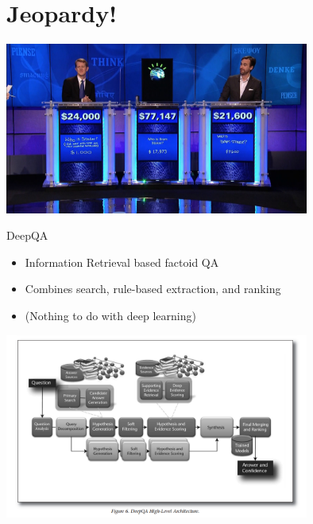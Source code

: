 \documentclass{beamer}
\begin{document}
{

}


{

}



{

}

{

}



{

}



\section{Jeopardy!}

\begin{frame}
  \begin{center}
    \includegraphics[width=10cm]{IBMwatson}
  \end{center}
\end{frame}

\begin{frame}{DeepQA}
  \begin{itemize}
  \item Information Retrieval based factoid QA
    \air 
  \item Combines search, rule-based extraction, and ranking 
    \air 
  \item (Nothing to do with deep learning)
  \end{itemize}
\end{frame}

\begin{frame}
  \begin{center}
    \includegraphics[width=10cm]{deepqa}
  \end{center}
\end{frame}
\end{document}
